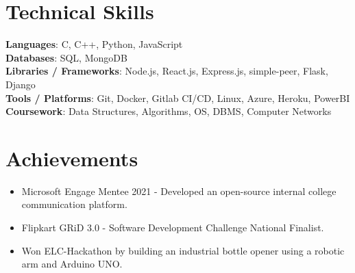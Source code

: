 \documentclass[letterpaper,11pt]{article}
\newcommand{\resumeItem}[1]{
  \item\small{
    {#1 \vspace{-2pt}}
  }
}
\newcommand{\resumeSubHeadingListStart}{\begin{itemize}[leftmargin=0.0in, label={}]}
\newcommand{\resumeSubHeadingListEnd}{\end{itemize}}
\newcommand{\resumeItemListStart}{\begin{itemize}}
\newcommand{\resumeItemListEnd}{\end{itemize}\vspace{-5pt}}
\begin{document}
 
%
\section{Technical Skills}
 \begin{itemize}[leftmargin=0.15in, label={}]
    \small{\item{
     \textbf{Languages}{: C, C++, Python, JavaScript} \\
     \textbf{Databases}{: SQL, MongoDB } \\
     \textbf{Libraries / Frameworks}{: Node.js, React.js, Express.js, simple-peer, Flask, Django} \\
     \textbf{Tools / Platforms}{: Git, Docker, Gitlab CI/CD, Linux, Azure, Heroku, PowerBI} \\
     \textbf{Coursework}{: Data Structures, Algorithms, OS, DBMS, Computer Networks} \\
    }}
 \end{itemize}



\section{Achievements}
    \resumeSubHeadingListStart
            \resumeItemListStart
                \resumeItem{Microsoft Engage Mentee 2021 - Developed an open-source internal college communication platform.}
                \resumeItem{Flipkart GRiD 3.0 - Software Development Challenge National Finalist.}
                \resumeItem{Won ELC-Hackathon by building an industrial bottle opener using a robotic arm and Arduino UNO.}
            \resumeItemListEnd
        
    \resumeSubHeadingListEnd
\end{document}
